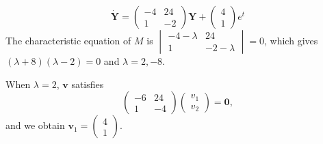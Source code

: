 \documentclass[a4paper]{article}
\begin{document}
\begin{eg}
  \[
    \mathbf{\dot{Y}} =
    \begin{pmatrix}
      -4 & 24\\
      1 & -2
    \end{pmatrix}
    \mathbf{Y} +
    \begin{pmatrix}
      4\\1
    \end{pmatrix}e^t
  \]
  The characteristic equation of $M$ is $
  \begin{vmatrix}
    -4 - \lambda & 24\\
    1 & -2 - \lambda
  \end{vmatrix} = 0$, which gives $(\lambda + 8)(\lambda - 2) = 0$ and $\lambda = 2, -8$.

  When $\lambda = 2$, $\mathbf{v}$ satisfies
  \[
    \begin{pmatrix}
      -6 & 24\\
      1 & -4
    \end{pmatrix}
    \begin{pmatrix}
      v_1\\v_2
    \end{pmatrix} = \mathbf{0},
  \]
  and we obtain $\mathbf{v}_1 =
  \begin{pmatrix}
    4\\1
  \end{pmatrix}$.


\end{eg}
\end{document}
